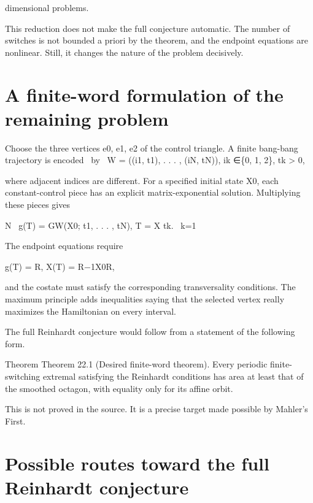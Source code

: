 dimensional problems.


This reduction does not make the full conjecture automatic. The number of switches is not bounded a priori by the theorem, and the endpoint equations are nonlinear. Still, it changes the nature of the problem decisively.


\section{A finite-word formulation of the remaining problem}

\begin{displaytext}
Choose the three vertices e0, e1, e2 of the control triangle. A finite bang-bang trajectory is encoded \
by \
W = ((i1, t1), . . . , (iN, tN)), ik ∈\{0, 1, 2\}, tk > 0,
\end{displaytext}

where adjacent indices are different. For a specified initial state X0, each constant-control piece has an explicit matrix-exponential solution. Multiplying these pieces gives


\begin{displaytext}
N \
g(T) = GW(X0; t1, . . . , tN), T = X tk. \
k=1
\end{displaytext}

The endpoint equations require


\begin{displaytext}
g(T) = R, X(T) = R−1X0R,
\end{displaytext}

and the costate must satisfy the corresponding transversality conditions. The maximum principle adds inequalities saying that the selected vertex really maximizes the Hamiltonian on every interval.


The full Reinhardt conjecture would follow from a statement of the following form.


\begin{statementbox}{Theorem}
Theorem 22.1 (Desired finite-word theorem). Every periodic finite-switching extremal satisfying the Reinhardt conditions has area at least that of the smoothed octagon, with equality only for its affine orbit.
\end{statementbox}

This is not proved in the source. It is a precise target made possible by Mahler’s First.


\section{Possible routes toward the full Reinhardt conjecture}

